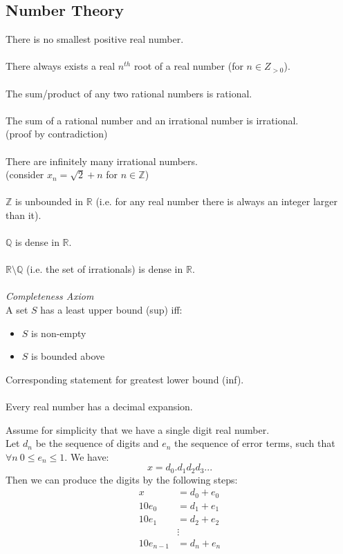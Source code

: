 \documentclass{scrartcl}
\newcommand{\R}{\mathbb{R}}
\newcommand{\Z}{\mathbb{Z}}
\newcommand{\Q}{\mathbb{Q}}
\begin{document}
\subsection{Number Theory}
There is no smallest positive real number.
\\\\
There always exists a real $ n^{th} $ root of a real number (for $ n \in Z_{>0} $).
\\\\
The sum/product of any two rational numbers is rational.
\\\\
The sum of a rational number and an irrational number is irrational.
\\
(proof by contradiction)
\\\\
There are infinitely many irrational numbers.
\\
(consider $ x_{n} = \sqrt{2} + n $ for $ n \in \Z $)
\\\\
$ \Z $ is unbounded in $ \R $ (i.e. for any real number there is always an integer larger than it).
\\\\
$ \Q $ is dense in $ \R $.
\\\\
$ \R \setminus \Q $ (i.e. the set of irrationals) is dense in $ \R $.
\\\\
\textit{Completeness Axiom}
\\
A set $ S $ has a least upper bound (sup) iff:
\begin{itemize}
\item $ S $ is non-empty
\item $ S $ is bounded above
\end{itemize}
Corresponding statement for greatest lower bound (inf).
\\\\
Every real number has a decimal expansion.
\\
\begin{tcolorbox}[breakable]
Assume for simplicity that we have a single digit real number.
\\
Let $ d_{n} $ be the sequence of digits and $ e_{n} $ the sequence of error terms, such that $ \forall n \ 0 \leq e_{n} \leq 1 $. We have:
\begin{equation}
x = d_{0}.d_{1}d_{2}d_{3}...
\end{equation}
Then we can produce the digits by the following steps:
\begin{align}
x & = d_{0} + e_{0} \\
10e_{0} & = d_{1} + e_{1} \\
10e_{1} & = d_{2} + e_{2} \\
& \vdots \\
10e_{n-1} & = d_{n} + e_{n}
\end{align}
\end{tcolorbox}
\end{document}
